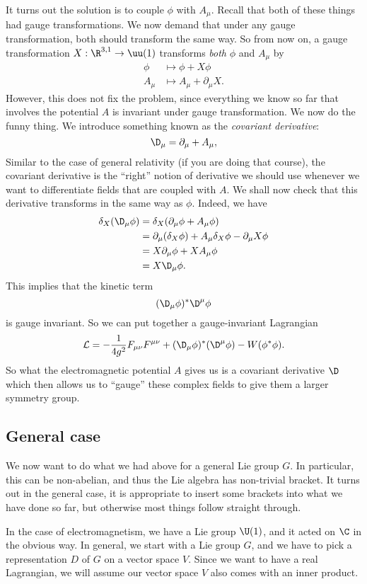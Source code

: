 \documentclass[a4paper]{article}
\begin{document}
It turns out the solution is to couple $\phi$ with $A_\mu$. Recall that both of these things had gauge transformations. We now demand that under any gauge transformation, both should transform the same way. So from now on, a gauge transformation $X: \R^{3, 1} \to \uu(1)$ transforms \emph{both} $\phi$ and $A_\mu$ by
\begin{align*}
  \phi &\mapsto \phi + X \phi\\
  A_\mu &\mapsto A_\mu + \partial_\mu X.
\end{align*}
However, this does not fix the problem, since everything we know so far that involves the potential $A$ is invariant under gauge transformation. We now do the funny thing. We introduce something known as the \emph{covariant derivative}:
\[
  \D_\mu = \partial_\mu + A_\mu,
\]
Similar to the case of general relativity (if you are doing that course), the covariant derivative is the ``right'' notion of derivative we should use whenever we want to differentiate fields that are coupled with $A$. We shall now check that this derivative transforms in the same way as $\phi$. Indeed, we have
\begin{align*}
  \delta_X(\D_\mu \phi) &= \delta_X(\partial_\mu \phi + A_\mu \phi)\\
  &= \partial_\mu (\delta_X \phi) + A_\mu \delta_X \phi - \partial_\mu X \phi\\
  &= X \partial_\mu \phi + X A_\mu \phi\\
  &= X \D_\mu \phi.
\end{align*}
This implies that the kinetic term
\[
  (\D_\mu \phi)^* \D^\mu \phi
\]
is gauge invariant. So we can put together a gauge-invariant Lagrangian
\[
  \mathcal{L} = -\frac{1}{4 g^2} F_{\mu\nu} F^{\mu\nu} + (\D_\mu \phi)^* (\D^\mu \phi) - W(\phi^* \phi).
\]
So what the electromagnetic potential $A$ gives us is a covariant derivative $\D$ which then allows us to ``gauge'' these complex fields to give them a larger symmetry group.

\subsection{General case}
We now want to do what we had above for a general Lie group $G$. In particular, this can be non-abelian, and thus the Lie algebra has non-trivial bracket. It turns out in the general case, it is appropriate to insert some brackets into what we have done so far, but otherwise most things follow straight through.

In the case of electromagnetism, we have a Lie group $\U(1)$, and it acted on $\C$ in the obvious way. In general, we start with a Lie group $G$, and we have to pick a representation $D$ of $G$ on a vector space $V$. Since we want to have a real Lagrangian, we will assume our vector space $V$ also comes with an inner product.
\end{document}
